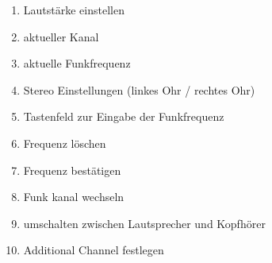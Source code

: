 	\begin{minipage} [b]{0.4\textwidth}
		\begin{enumerate}
			\item Lautstärke einstellen
			\item aktueller Kanal
			\item aktuelle Funkfrequenz
			\item Stereo Einstellungen (linkes Ohr / rechtes Ohr)
			\item Tastenfeld zur Eingabe der Funkfrequenz
			\item Frequenz löschen
			\item Frequenz bestätigen
			\item Funk kanal wechseln
			\item umschalten zwischen Lautsprecher und Kopfhörer
			\item Additional Channel festlegen
		\end{enumerate}
	\end{minipage}
